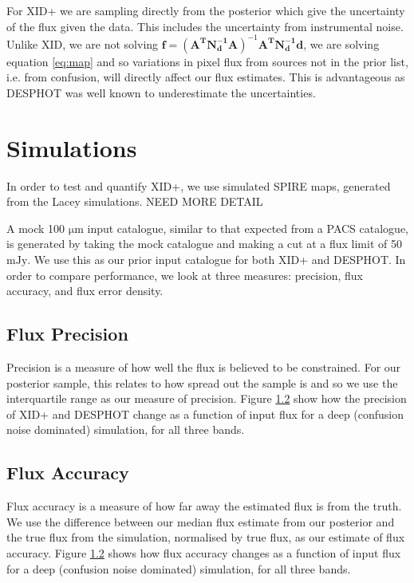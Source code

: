 \documentclass[useAMS,usenatbib]{mn2e}
\begin{document}
For XID+ we are sampling directly from the posterior which give the uncertainty of the flux given the data. This includes the uncertainty from instrumental noise. Unlike XID, we are not solving $\mathbf{f}=(\mathbf{A^TN_d^{-1}A})^{-1}\mathbf{A^TN_d^{-1}d}$, we are solving equation \ref{eq:map} and so variations in pixel flux from sources not in the prior list, i.e. from confusion, will directly affect our flux estimates. This is advantageous as DESPHOT was well known to underestimate the uncertainties.


\section{Simulations}
In order to test and quantify XID+, we use simulated SPIRE maps, generated from the Lacey simulations. NEED MORE DETAIL

A mock 100 $\mathrm{\mu m}$ input catalogue, similar to that expected from a PACS catalogue, is generated by taking the mock catalogue and making a cut at a flux limit of 50 $\mathrm{mJy}$. We use this as our prior input catalogue for both XID+ and DESPHOT. In order to compare performance, we look at three measures: precision, flux accuracy, and flux error density.

\subsection{Flux Precision}
Precision is a measure of how well the flux is believed to be constrained. For our posterior sample, this relates to how spread out the sample is and so we use the interquartile range as our measure of precision. Figure \ref{} show how the precision of XID+ and DESPHOT change as a function of input flux for a deep (confusion noise dominated) simulation, for all three bands. 

\subsection{Flux Accuracy}
Flux accuracy is a measure of how far away the estimated flux is from the truth. We use the difference between our median flux estimate from our posterior and the true flux from the simulation, normalised by true flux, as our estimate of flux accuracy. Figure \ref{} shows how flux accuracy changes as a function of input flux for a deep (confusion noise dominated) simulation, for all three bands. 
\end{document}
